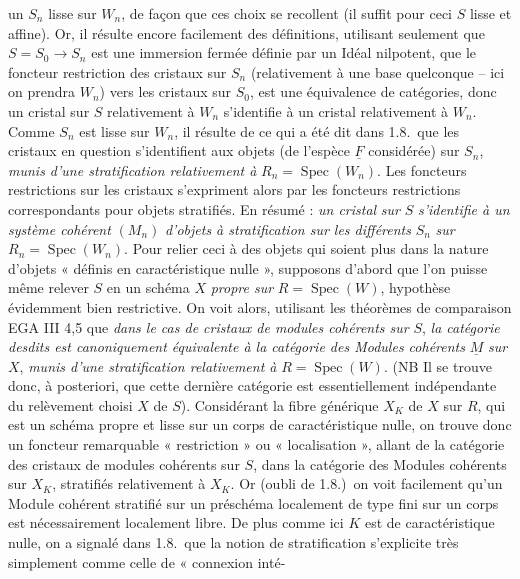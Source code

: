 \documentclass[11pt,a4paper]{article}
\begin{document}
un $S_n$ lisse sur $W_n$, de façon que ces choix se recollent (il suffit pour
ceci $S$ lisse et affine). Or, il résulte encore facilement des définitions,
utilisant seulement que $S=S_0\to S_n$ est une immersion fermée définie par un
Idéal nilpotent, que le foncteur restriction des cristaux sur $S_n$
(relativement à une base quelconque -- ici on prendra $W_n$) vers les
cristaux sur $S_0$, est une équivalence de catégories, donc un cristal sur $S$
relativement à $W_n$ s'identifie à un cristal  relativement à
$W_n$. Comme $S_n$ est lisse sur $W_n$, il résulte de ce qui a été dit dans
1.8.\ que les cristaux en question s'identifient aux objets (de l'espèce
$\underline{F}$ considérée) sur $S_n$, \emph{munis d'une stratification
relativement à} $R_n=\operatorname{Spec}(W_n)$. Les foncteurs restrictions sur
les cristaux s'expriment alors par les foncteurs restrictions correspondants
pour objets stratifiés. En résumé : \emph{un cristal} 
\emph{sur} $S$ \emph{s'identifie à un système cohérent} $(M_n)$ \emph{d'objets
à stratification sur les différents} $S_n$ \emph{sur}
$R_n=\operatorname{Spec}(W_n)$. Pour relier ceci à des
objets qui soient plus dans la nature d'objets « définis en caractéristique
nulle », supposons d'abord que l'on puisse même relever $S$ en un schéma $X$
\emph{propre sur} $R=\operatorname{Spec}(W)$, hypothèse évidemment bien
restrictive. On voit alors, utilisant les théorèmes de comparaison EGA III 4,5
que \emph{dans le cas de cristaux de modules cohérents sur} $S$, \emph{la
catégorie desdits est canoniquement équivalente à la catégorie des Modules
cohérents} $\underline{M}$ \emph{sur} $X$, \emph{munis d'une stratification
relativement à} $R=\operatorname{Spec}(W)$. (NB Il se trouve donc, à
posteriori, que cette dernière catégorie est essentiellement indépendante du
relèvement choisi $X$ de $S$). Considérant la fibre générique $X_K$ de $X$ sur
$R$, qui est un schéma propre et lisse sur un corps de caractéristique nulle,
on trouve donc un foncteur remarquable « restriction » ou « localisation »,
allant de la catégorie des cristaux de modules cohérents sur $S$, dans la
catégorie des Modules cohérents sur $X_K$, stratifiés relativement à $X_K$. Or
(oubli de 1.8.)\ on voit facilement qu'un Module cohérent stratifié sur un
préschéma localement de type fini sur un corps est nécessairement localement
libre. De plus comme ici $K$ est de caractéristique nulle, on a signalé dans 1.8.\ que la notion de stratification s'explicite
très simplement comme celle de « connexion inté-
\end{document}
